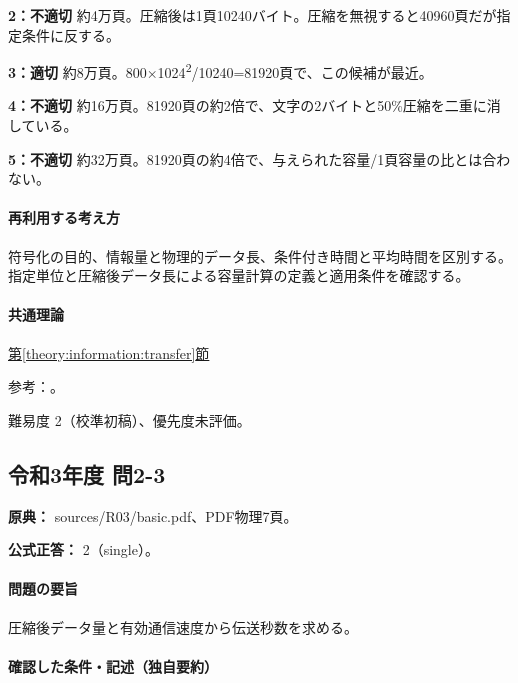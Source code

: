 \noindent\textbf{2：不適切} 約4万頁。圧縮後は1頁10240バイト。圧縮を無視すると40960頁だが指定条件に反する。\par

\noindent\textbf{3：適切} 約8万頁。800×1024\textsuperscript{2}/10240=\allowbreak{}81920頁で、この候補が最近。\par

\noindent\textbf{4：不適切} 約16万頁。81920頁の約2倍で、文字の2バイトと50\%圧縮を二重に消している。\par

\noindent\textbf{5：不適切} 約32万頁。81920頁の約4倍で、与えられた容量/1頁容量の比とは合わない。\par

\paragraph{再利用する考え方} 符号化の目的、情報量と物理的データ長、条件付き時間と平均時間を区別する。指定単位と圧縮後データ長による容量計算の定義と適用条件を確認する。

\paragraph{共通理論} \hyperref[theory:information:transfer]{第\ref*{theory:information:transfer}節}

\par 参考：\cite{info_deflate}。

\par 難易度 2（校準初稿）、優先度未評価。

\subsection{令和3年度 問2-3}
\label{q:r03-reg-basic-2-3}

\noindent\textbf{原典：} sources/R03/basic.pdf、PDF物理7頁。

\textbf{公式正答：} 2（single）。

\paragraph{問題の要旨} 圧縮後データ量と有効通信速度から伝送秒数を求める。

\paragraph{確認した条件・記述（独自要約）}\mbox{}\par

